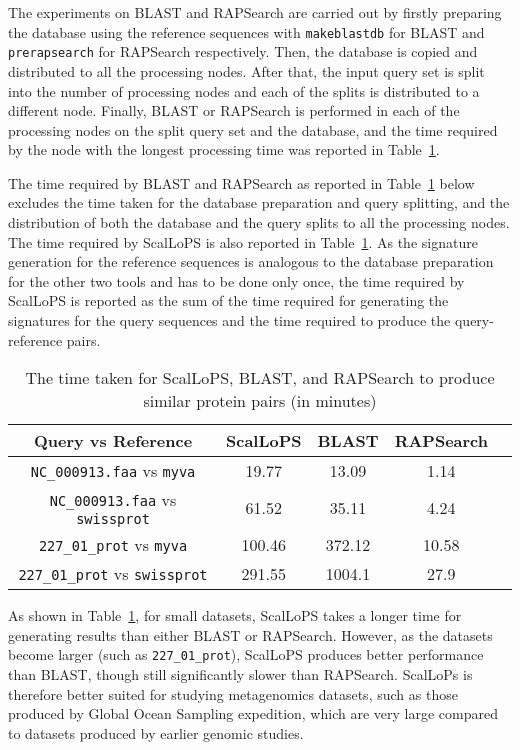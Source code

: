 \documentclass[titlepage]{csetr}
\begin{document}
The experiments on BLAST and RAPSearch are carried out by firstly preparing the database using the reference sequences with \texttt{makeblastdb} for BLAST and \texttt{prerapsearch} for RAPSearch respectively. Then, the database is copied and distributed to all the processing nodes. After that, the input query set is split into the number of processing nodes and each of the splits is distributed to a different node. Finally, BLAST or RAPSearch is performed in each of the processing nodes on the split query set and the database, and the time required by the node with the longest processing time was reported in Table~\ref{tbl:PerformanceImprovement}.

The time required by BLAST and RAPSearch as reported in Table~\ref{tbl:PerformanceImprovement} below excludes the time taken for the database preparation and query splitting, and the distribution of both the database and the query splits to all the processing nodes. The time required by ScalLoPS is also reported in Table~\ref{tbl:PerformanceImprovement}. As the signature generation for the reference sequences is analogous to the database preparation for the other two tools and has to be done only once, the time required by ScalLoPS is reported as the sum of the time required for generating the signatures for the query sequences and the time required to produce the query-reference pairs.

\begin{table}[!ht]
\centering
\caption{The time taken for ScalLoPS, BLAST, and RAPSearch to produce similar protein pairs (in minutes)}
\label{tbl:PerformanceImprovement}
\begin{tabular} { | c | c | c | c | c |}
\hline
Query vs Reference & ScalLoPS & BLAST & RAPSearch \\
\hline
\texttt{NC\_000913.faa} vs \texttt{myva} & 19.77 & 13.09 & 1.14\\
\texttt{NC\_000913.faa} vs \texttt{swissprot} & 61.52 & 35.11 & 4.24\\
\texttt{227\_01\_prot} vs \texttt{myva} & 100.46 & 372.12 & 10.58\\
\texttt{227\_01\_prot} vs \texttt{swissprot} & 291.55 & 1004.1 & 27.9\\
\hline
\end{tabular}
\end{table}

As shown in Table~\ref{tbl:PerformanceImprovement}, for small datasets, ScalLoPS takes a longer time for generating results than either BLAST or RAPSearch. However, as the datasets become larger (such as \texttt{227\_01\_prot}), ScalLoPS produces better performance than BLAST, though still significantly slower than RAPSearch. ScalLoPs is therefore better suited for studying metagenomics datasets, such as those produced by Global Ocean Sampling expedition, which are very large compared to datasets produced by earlier genomic studies.
\end{document}
